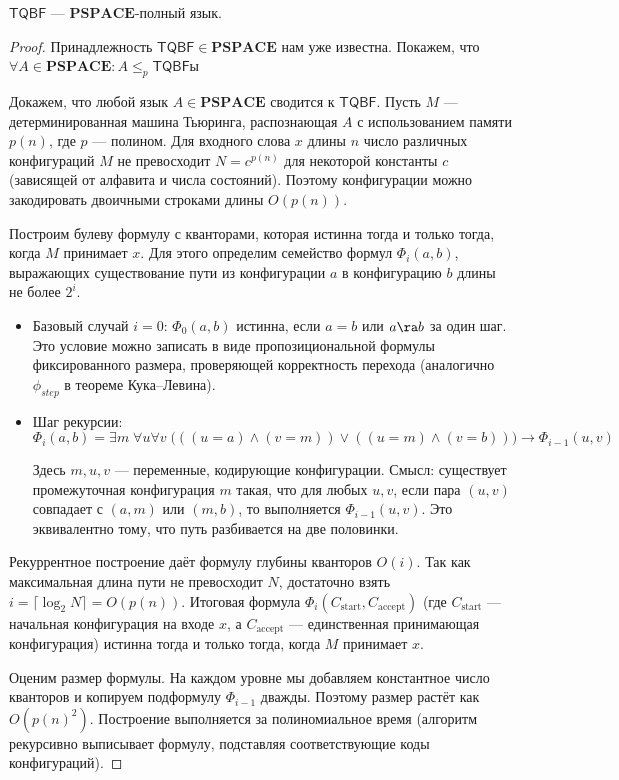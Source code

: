 \begin{theorem}
    \(\mathsf{TQBF}\) --- \(\mathbf{PSPACE}\)-полный язык.
\end{theorem}
\begin{proof}
    Принадлежность \(\mathsf{TQBF} \in \mathbf{PSPACE}\) нам уже известна. Покажем, что \(\forall A \in \mathbf{PSPACE}: A \le_p \mathsf{TQBF}\)ы

    Докажем, что любой язык \(A \in \mathbf{PSPACE}\) сводится к \(\mathsf{TQBF}\). Пусть \(M\) — детерминированная машина Тьюринга, распознающая \(A\) с использованием памяти \(p(n)\), где \(p\) — полином. Для входного слова \(x\) длины \(n\) число различных конфигураций \(M\) не превосходит \(N = c^{p(n)}\) для некоторой константы \(c\) (зависящей от алфавита и числа состояний). Поэтому конфигурации можно закодировать двоичными строками длины \(O(p(n))\).  

    Построим булеву формулу с кванторами, которая истинна тогда и только тогда, когда \(M\) принимает \(x\). Для этого определим семейство формул \(\Phi_i(a,b)\), выражающих существование пути из конфигурации \(a\) в конфигурацию \(b\) длины не более \(2^i\).  

    \begin{itemize}
        \item Базовый случай \(i = 0\): \(\Phi_0(a,b)\) истинна, если \(a = b\) или \(a \ra b\) за один шаг. Это условие можно записать в виде пропозициональной формулы фиксированного размера, проверяющей корректность перехода (аналогично \(\phi_{step}\) в теореме Кука–Левина).  
        \item Шаг рекурсии:  
        \[\Phi_i(a,b) = \exists m\; \forall u\forall v\; \bigl( ((u=a)\land(v=m)) \lor ((u=m)\land(v=b)) \bigr) \to \Phi_{i-1}(u,v)\]

        Здесь \(m, u, v\) — переменные, кодирующие конфигурации. Смысл: существует промежуточная конфигурация \(m\) такая, что для любых \(u,v\), если пара \((u,v)\) совпадает с \((a,m)\) или \((m,b)\), то выполняется \(\Phi_{i-1}(u,v)\). Это эквивалентно тому, что путь разбивается на две половинки.  
            
    \end{itemize}
    Рекуррентное построение даёт формулу глубины кванторов \(O(i)\). Так как максимальная длина пути не превосходит \(N\), достаточно взять \(i = \lceil \log_2 N\rceil = O(p(n))\). Итоговая формула \(\Phi_i(C_{\text{start}}, C_{\text{accept}})\) (где \(C_{\text{start}}\) — начальная конфигурация на входе \(x\), а \(C_{\text{accept}}\) --- единственная принимающая конфигурация) истинна тогда и только тогда, когда \(M\) принимает \(x\).  
    
    Оценим размер формулы. На каждом уровне мы добавляем константное число кванторов и копируем подформулу \(\Phi_{i-1}\) дважды. Поэтому размер растёт как \(O(p(n)^2)\). Построение выполняется за полиномиальное время (алгоритм рекурсивно выписывает формулу, подставляя соответствующие коды конфигураций).  
\end{proof}

